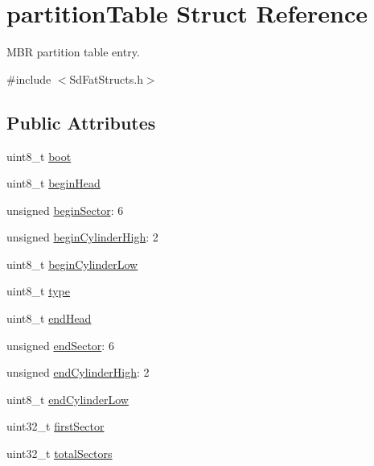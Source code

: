 \hypertarget{structpartition_table}{}\section{partition\+Table Struct Reference}
\label{structpartition_table}


M\+BR partition table entry.  




{\ttfamily \#include $<$Sd\+Fat\+Structs.\+h$>$}

\subsection*{Public Attributes}
\begin{DoxyCompactItemize}
\item 
uint8\+\_\+t \hyperlink{structpartition_table_adf386afb1f33046d8b6a1a0afa780ec9}{boot}
\item 
uint8\+\_\+t \hyperlink{structpartition_table_a7d426694b8cf2151ae38568670a8c845}{begin\+Head}
\item 
unsigned \hyperlink{structpartition_table_ae201c11d9671c9efc307c654a2b6c026}{begin\+Sector}\+: 6
\item 
unsigned \hyperlink{structpartition_table_a744f0c7f9ad4c426b10de085b4f52392}{begin\+Cylinder\+High}\+: 2
\item 
uint8\+\_\+t \hyperlink{structpartition_table_a941fcb4df298f5f73ccca011bf40787a}{begin\+Cylinder\+Low}
\item 
uint8\+\_\+t \hyperlink{structpartition_table_a3861cf276c728c4dd30ca04e74197ee8}{type}
\item 
uint8\+\_\+t \hyperlink{structpartition_table_a4a3945bfd3a29f474984cb9f180dbd51}{end\+Head}
\item 
unsigned \hyperlink{structpartition_table_a27cdc4320c418ed0d833ab163ed77ad7}{end\+Sector}\+: 6
\item 
unsigned \hyperlink{structpartition_table_a32fea225b8ffd925ad919ffc56e9abda}{end\+Cylinder\+High}\+: 2
\item 
uint8\+\_\+t \hyperlink{structpartition_table_ad7829e34be70084abe145227b0d18274}{end\+Cylinder\+Low}
\item 
uint32\+\_\+t \hyperlink{structpartition_table_a02bbdff840c854dc96fa0b6da8589d86}{first\+Sector}
\item 
uint32\+\_\+t \hyperlink{structpartition_table_acf96e59ce648a9a0cf35751c3b6d7730}{total\+Sectors}
\end{DoxyCompactItemize}


